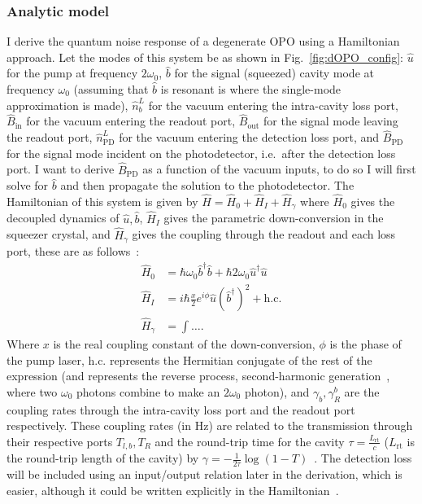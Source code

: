 \subsubsection{Analytic model}
\label{sec:dOPO_model}

I derive the quantum noise response of a degenerate OPO using a Hamiltonian approach. Let the modes of this system be as shown in Fig.~\ref{fig:dOPO_config}: $\hat u$ for the pump at frequency $2\omega_0$, $\hat b$ for the signal (squeezed) cavity mode at frequency $\omega_0$ (assuming that $\hat b$ is resonant is where the single-mode approximation is made), $\hat n^L_b$ for the vacuum entering the intra-cavity loss port, $\hat B_\text{in}$ for the vacuum entering the readout port, $\hat B_\text{out}$ for the signal mode leaving the readout port, $\hat n^L_\text{PD}$ for the vacuum entering the detection loss port, and $\hat B_\text{PD}$ for the signal mode incident on the photodetector, i.e.\ after the detection loss port. I want to derive $\hat B_\text{PD}$ as a function of the vacuum inputs, to do so I will first solve for $\hat b$ and then propagate the solution to the photodetector. 
The Hamiltonian of this system is given by $\hat H = \hat H_0 + \hat H_I + \hat H_\gamma$ where $\hat H_0$ gives the decoupled dynamics of $\hat u, \hat b$, $\hat H_I$ gives the parametric down-conversion in the squeezer crystal, and $\hat H_\gamma$ gives the coupling through the readout and each loss port, these are as follows~\cite{}: 
\begin{align}
\hat H_0 &= \hbar \omega_0 \hat b^\dag \hat b + \hbar 2 \omega_0 \hat u^\dag \hat u\\
\hat H_I &= i \hbar \frac{x}{2} e^{i\phi} \hat u (\hat b^\dag)^2 + \text{h.c.}\\
\hat H_\gamma &= \int \ldots .
\end{align}
Where $x$ is the real coupling constant of the down-conversion, $\phi$ is the phase of the pump laser, $\text{h.c.}$ represents the Hermitian conjugate of the rest of the expression (and represents the reverse process, second-harmonic generation~\cite{}, where two $\omega_0$ photons combine to make an $2\omega_0$ photon), and $\gamma_b, \gamma^b_R$ are the coupling rates through the intra-cavity loss port and the readout port respectively. These coupling rates (in Hz) are related to the transmission through their respective ports $T_{l,b}, T_R$ and the round-trip time for the cavity $\tau = \frac{L_\text{rt}}{c}$ ($L_\text{rt}$ is the round-trip length of the cavity) by $\gamma = -\frac{1}{2\tau}\log(1-T)$~\cite{}. The detection loss will be included using an input/output relation later in the derivation, which is easier, although it could be written explicitly in the Hamiltonian~\cite{}. 

